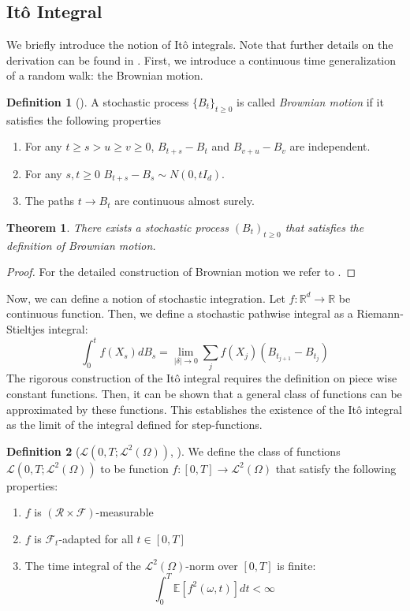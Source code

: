 \documentclass[12pt]{article}
\newtheorem{theorem}{Theorem}[section]
\theoremstyle{definition}
\newtheorem{definition}[definition]{Definition}
\numberwithin{equation}{section}
\newcommand{\R}{\mathbb{R}}
\newcommand{\CF}{\mathcal{F}}
\newcommand{\CL}{\mathcal{L}}
\newcommand{\CR}{\mathcal{R}}
\newcommand{\ev}[1]{\mathbb{E}\left[{#1}\right]}
\begin{document}
\subsection{Itô Integral}
\label{subsec:ItoIntegral}
We briefly introduce the notion of Itô integrals. Note that further details on the derivation can be found in \autocite{eAppliedStochasticAnalysis2021}. 
First, we introduce a continuous time generalization of a random walk: the Brownian motion.
\begin{definition}[\autocite{durrettProbabilityTheoryExamples2019}]
  A stochastic process $\{B_t\}_{t \geq 0}$ is called \emph{Brownian motion} if it satisfies the following properties
  \begin{enumerate}[label=(\roman*)]
    \item For any $t \geq s > u \geq v \geq 0$, $B_{t+s} - B_t$ and $B_{v+u} - B_v$ are independent.
    \item For any $s,t \geq 0$ $B_{t+s} - B_s \sim N(0, tI_d)$.
    \item The paths $t \rightarrow B_t$ are continuous almost surely.
  \end{enumerate}
\end{definition}
\begin{theorem}
  There exists a stochastic process $(B_t)_{t \geq 0}$ that satisfies the definition of Brownian motion.
\end{theorem}
\begin{proof}
  For the detailed construction of Brownian motion we refer to \autocite{durrettProbabilityTheoryExamples2019}.
\end{proof}
Now, we can define a notion of stochastic integration. Let $f : \R^d \rightarrow \R$ be continuous function. Then, we define a stochastic pathwise integral as a Riemann-Stieltjes integral:
\begin{equation*}
  \int_0^t f(X_s) dB_s = \lim\limits_{|\delta| \rightarrow 0} \sum_j f(X_j)(B_{t_{j+1}} - B_{t_j})
\end{equation*}
The rigorous construction of the Itô integral requires the definition on piece wise constant functions. Then, it can be shown that a general class of functions can be approximated by these functions. This establishes the existence of the Itô integral as the limit of the integral defined for step-functions.
\begin{definition}[$\CL(0,T;\CL^2(\Omega))$, ]
  We define the class of functions $\CL(0,T;\CL^2(\Omega))$ to be function $f : [0,T] \rightarrow \CL^2(\Omega)$ that satisfy the following properties:
  \begin{enumerate}
    \item $f$ is $(\CR \times \CF)$-measurable
    \item $f$ is $\CF_t$-adapted for all $t \in [0,T]$
    \item The time integral of the $\CL^2(\Omega)$-norm over $[0,T]$ is finite:
    \begin{equation*}
      \int_0^T \ev{f^2(\omega,t)}dt< \infty
    \end{equation*}
  \end{enumerate}
\end{definition}
\end{document}
